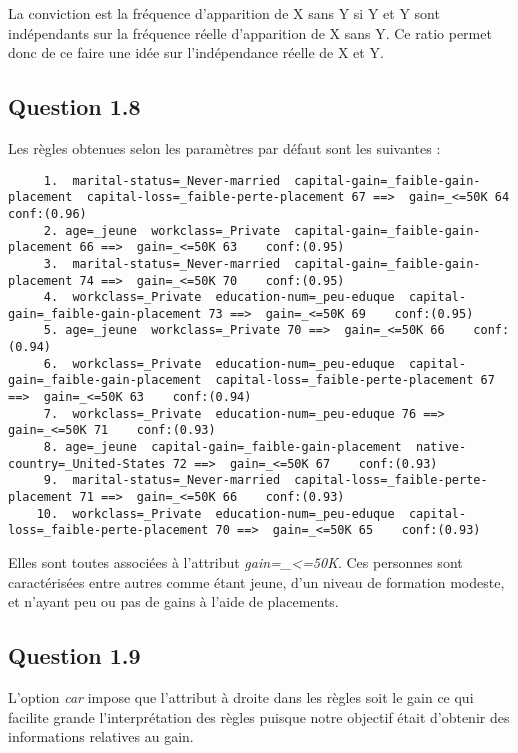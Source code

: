 \documentclass[a4paper,12pt]{article}
\begin{document}
La conviction est la fréquence d'apparition de X sans Y si Y et Y sont indépendants sur la fréquence réelle d'apparition de X sans Y.
Ce ratio permet donc de ce faire une idée sur l'indépendance réelle de X et Y.


\subsection*{Question 1.8}

Les règles obtenues selon les paramètres par défaut sont les suivantes :

\begin{lstlisting}
	 1.  marital-status=_Never-married  capital-gain=_faible-gain-placement  capital-loss=_faible-perte-placement 67 ==>  gain=_<=50K 64    conf:(0.96)
	 2. age=_jeune  workclass=_Private  capital-gain=_faible-gain-placement 66 ==>  gain=_<=50K 63    conf:(0.95)
	 3.  marital-status=_Never-married  capital-gain=_faible-gain-placement 74 ==>  gain=_<=50K 70    conf:(0.95)
	 4.  workclass=_Private  education-num=_peu-eduque  capital-gain=_faible-gain-placement 73 ==>  gain=_<=50K 69    conf:(0.95)
	 5. age=_jeune  workclass=_Private 70 ==>  gain=_<=50K 66    conf:(0.94)
	 6.  workclass=_Private  education-num=_peu-eduque  capital-gain=_faible-gain-placement  capital-loss=_faible-perte-placement 67 ==>  gain=_<=50K 63    conf:(0.94)
	 7.  workclass=_Private  education-num=_peu-eduque 76 ==>  gain=_<=50K 71    conf:(0.93)
	 8. age=_jeune  capital-gain=_faible-gain-placement  native-country=_United-States 72 ==>  gain=_<=50K 67    conf:(0.93)
	 9.  marital-status=_Never-married  capital-loss=_faible-perte-placement 71 ==>  gain=_<=50K 66    conf:(0.93)
	10.  workclass=_Private  education-num=_peu-eduque  capital-loss=_faible-perte-placement 70 ==>  gain=_<=50K 65    conf:(0.93)
\end{lstlisting}

Elles sont toutes associées à l'attribut \textit{gain=\_<=50K}.
Ces personnes sont caractérisées entre autres comme étant jeune, d'un niveau de formation modeste, et n'ayant peu ou pas de gains à l'aide de placements.


\subsection*{Question 1.9}

L'option \textit{car} impose que l'attribut à droite dans les règles soit le gain ce qui facilite grande l'interprétation des règles puisque notre objectif était d'obtenir des informations relatives au gain.
\end{document}
